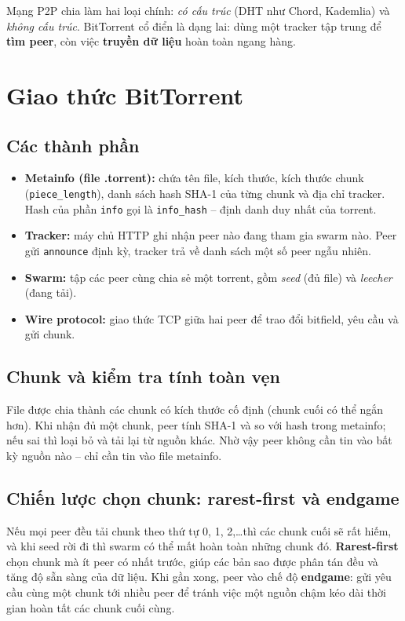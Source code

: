 \documentclass[12pt,a4paper,oneside]{report}
\begin{document}
Mạng P2P chia làm hai loại chính: \textit{có cấu trúc} (DHT như Chord, Kademlia) và \textit{không cấu trúc}. BitTorrent cổ điển là dạng lai: dùng một tracker tập trung để \textbf{tìm peer}, còn việc \textbf{truyền dữ liệu} hoàn toàn ngang hàng.

\section{Giao thức BitTorrent}

\subsection{Các thành phần}
\begin{itemize}
  \item \textbf{Metainfo (file .torrent):} chứa tên file, kích thước, kích thước chunk (\texttt{piece\_length}), danh sách hash SHA-1 của từng chunk và địa chỉ tracker. Hash của phần \texttt{info} gọi là \texttt{info\_hash} -- định danh duy nhất của torrent.
  \item \textbf{Tracker:} máy chủ HTTP ghi nhận peer nào đang tham gia swarm nào. Peer gửi \texttt{announce} định kỳ, tracker trả về danh sách một số peer ngẫu nhiên.
  \item \textbf{Swarm:} tập các peer cùng chia sẻ một torrent, gồm \textit{seed} (đủ file) và \textit{leecher} (đang tải).
  \item \textbf{Wire protocol:} giao thức TCP giữa hai peer để trao đổi bitfield, yêu cầu và gửi chunk.
\end{itemize}

\subsection{Chunk và kiểm tra tính toàn vẹn}
File được chia thành các chunk có kích thước cố định (chunk cuối có thể ngắn hơn). Khi nhận đủ một chunk, peer tính SHA-1 và so với hash trong metainfo; nếu sai thì loại bỏ và tải lại từ nguồn khác. Nhờ vậy peer không cần tin vào bất kỳ nguồn nào -- chỉ cần tin vào file metainfo.

\subsection{Chiến lược chọn chunk: rarest-first và endgame}
Nếu mọi peer đều tải chunk theo thứ tự 0, 1, 2,\dots thì các chunk cuối sẽ rất hiếm, và khi seed rời đi thì swarm có thể mất hoàn toàn những chunk đó. \textbf{Rarest-first} chọn chunk mà ít peer có nhất trước, giúp các bản sao được phân tán đều và tăng độ sẵn sàng của dữ liệu. Khi gần xong, peer vào chế độ \textbf{endgame}: gửi yêu cầu cùng một chunk tới nhiều peer để tránh việc một nguồn chậm kéo dài thời gian hoàn tất các chunk cuối cùng.
\end{document}
